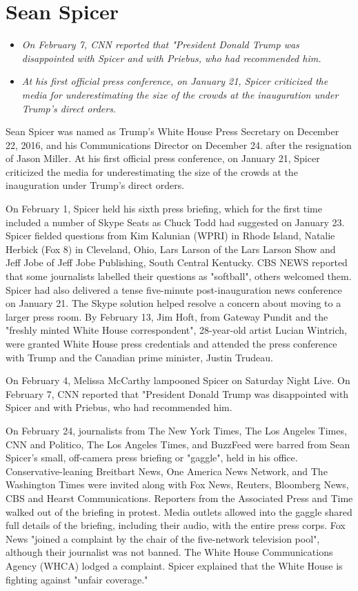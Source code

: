 \section{Sean Spicer}\label{sean-spicer}

\begin{itemize}
\item
  \emph{On February 7, CNN reported that "President Donald Trump was
  disappointed with Spicer and with Priebus, who had recommended him.}
\item
  \emph{At his first official press conference, on January 21, Spicer
  criticized the media for underestimating the size of the crowds at the
  inauguration under Trump's direct orders.}
\end{itemize}

Sean Spicer was named as Trump's White House Press Secretary on December
22, 2016, and his Communications Director on December 24. after the
resignation of Jason Miller. At his first official press conference, on
January 21, Spicer criticized the media for underestimating the size of
the crowds at the inauguration under Trump's direct orders.

On February 1, Spicer held his sixth press briefing, which for the first
time included a number of Skype Seats as Chuck Todd had suggested on
January 23. Spicer fielded questions from Kim Kalunian (WPRI) in Rhode
Island, Natalie Herbick (Fox 8) in Cleveland, Ohio, Lars Larson of the
Lars Larson Show and Jeff Jobe of Jeff Jobe Publishing, South Central
Kentucky. CBS NEWS reported that some journalists labelled their
questions as "softball", others welcomed them. Spicer had also delivered
a tense five-minute post-inauguration news conference on January 21. The
Skype solution helped resolve a concern about moving to a larger press
room. By February 13, Jim Hoft, from Gateway Pundit and the "freshly
minted White House correspondent", 28-year-old artist Lucian Wintrich,
were granted White House press credentials and attended the press
conference with Trump and the Canadian prime minister, Justin Trudeau.

On February 4, Melissa McCarthy lampooned Spicer on Saturday Night Live.
On February 7, CNN reported that "President Donald Trump was
disappointed with Spicer and with Priebus, who had recommended him.

On February 24, journalists from The New York Times, The Los Angeles
Times, CNN and Politico, The Los Angeles Times, and BuzzFeed were barred
from Sean Spicer's small, off-camera press briefing or "gaggle", held in
his office. Conservative-leaning Breitbart News, One America News
Network, and The Washington Times were invited along with Fox News,
Reuters, Bloomberg News, CBS and Hearst Communications. Reporters from
the Associated Press and Time walked out of the briefing in protest.
Media outlets allowed into the gaggle shared full details of the
briefing, including their audio, with the entire press corps. Fox News
"joined a complaint by the chair of the five-network television pool",
although their journalist was not banned. The White House Communications
Agency (WHCA) lodged a complaint. Spicer explained that the White House
is fighting against "unfair coverage."

